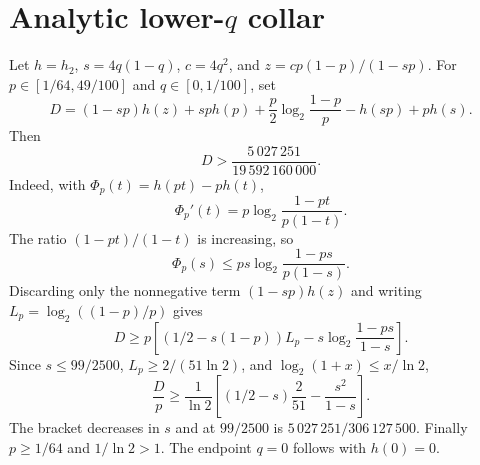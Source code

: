 \documentclass{article}
\begin{document}
\section*{Analytic lower-$q$ collar}
Let $h=h_2$, $s=4q(1-q)$, $c=4q^2$, and
$z=cp(1-p)/(1-sp)$.  For
$p\in[1/64,49/100]$ and $q\in[0,1/100]$, set
\[
D=(1-sp)h(z)+sp h(p)+\frac p2\log_2\frac{1-p}{p}
-h(sp)+p h(s).
\]
Then
\[
D>\frac{5\,027\,251}{19\,592\,160\,000}.
\]
Indeed, with $\Phi_p(t)=h(pt)-ph(t)$,
\[
\Phi_p'(t)=p\log_2\frac{1-pt}{p(1-t)}.
\]
The ratio $(1-pt)/(1-t)$ is increasing, so
\[
\Phi_p(s)\le ps\log_2\frac{1-ps}{p(1-s)}.
\]
Discarding only the nonnegative term $(1-sp)h(z)$ and writing
$L_p=\log_2((1-p)/p)$ gives
\[
D\ge p\left[(1/2-s(1-p))L_p
-s\log_2\frac{1-ps}{1-s}\right].
\]
Since $s\le99/2500$, $L_p\ge2/(51\ln2)$, and
$\log_2(1+x)\le x/\ln2$,
\[
\frac Dp\ge\frac1{\ln2}
\left[(1/2-s)\frac2{51}-\frac{s^2}{1-s}\right].
\]
The bracket decreases in $s$ and at $99/2500$ is
$5\,027\,251/306\,127\,500$.  Finally $p\ge1/64$ and
$1/\ln2>1$.  The endpoint $q=0$ follows with $h(0)=0$.
\end{document}
